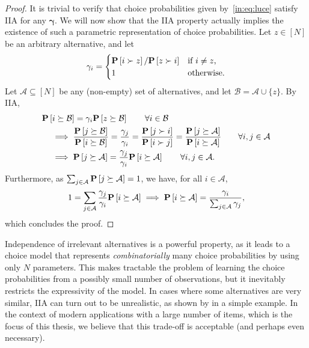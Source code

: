 \begin{proof}
It is trivial to verify that choice probabilities given by~\eqref{in:eq:luce} satisfy IIA for any $\bm{\gamma}$.
We will now show that the IIA property actually implies the existence of such a parametric representation of choice probabilities.
Let $z \in [N]$ be an arbitrary alternative, and let
\begin{align*}
\gamma_i =
\begin{cases}
\mathbf{P}\left[ i \succ z \right] / \mathbf{P}\left[ z \succ i \right] & \text{if $i \ne z$,} \\
1                                   & \text{otherwise.} \\
\end{cases}
\end{align*}
Let $\mathcal{A} \subseteq [N]$ be any (non-empty) set of alternatives, and let $\mathcal{B} = \mathcal{A} \cup \{ z \}$.
By IIA,
\begin{align*}
&\mathbf{P}\left[ i \succeq \mathcal{B} \right] = \gamma_i \mathbf{P}\left[ z \succeq \mathcal{B} \right]
    \qquad \forall i \in \mathcal{B} \\
&\quad \implies
    \frac{\mathbf{P}\left[ j \succeq \mathcal{B} \right]}{\mathbf{P}\left[ i \succeq \mathcal{B} \right]}
    = \frac{\gamma_j}{\gamma_i}
    = \frac{\mathbf{P}\left[ j \succ i \right]}{\mathbf{P}\left[ i \succ j \right]}
    = \frac{\mathbf{P}\left[ j \succeq \mathcal{A} \right]}{\mathbf{P}\left[ i \succeq \mathcal{A} \right]}
    \qquad \forall i, j \in \mathcal{A} \\
&\quad \implies \mathbf{P}\left[ j \succeq \mathcal{A} \right] = \frac{\gamma_j}{\gamma_i} \mathbf{P}\left[ i \succeq \mathcal{A} \right]
    \qquad \forall i, j \in \mathcal{A}.
\end{align*}
Furthermore, as $\sum_{j \in \mathcal{A}} \mathbf{P}\left[ j \succeq \mathcal{A} \right] = 1$, we have, for all $i \in \mathcal{A}$,
\begin{align*}
1 = \sum_{j \in \mathcal{A}} \frac{\gamma_j}{\gamma_i} \mathbf{P}\left[ i \succeq \mathcal{A} \right]
    \implies \mathbf{P}\left[ i \succeq \mathcal{A} \right] = \frac{\gamma_i}{\sum_{j \in \mathcal{A}} \gamma_j},
\end{align*}
which concludes the proof.
\end{proof}

Independence of irrelevant alternatives is a powerful property, as it leads to a choice model that represents \emph{combinatorially} many choice probabilities by using only $N$ parameters.
This makes tractable the problem of learning the choice probabilities from a possibly small number of observations, but it inevitably restricts the expressivity of the model.
In cases where some alternatives are very similar, IIA can turn out to be unrealistic, as shown by \citet{debreu1960review} in a simple example.
In the context of modern applications with a large number of items, which is the focus of this thesis, we believe that this trade-off is acceptable (and perhaps even necessary).

